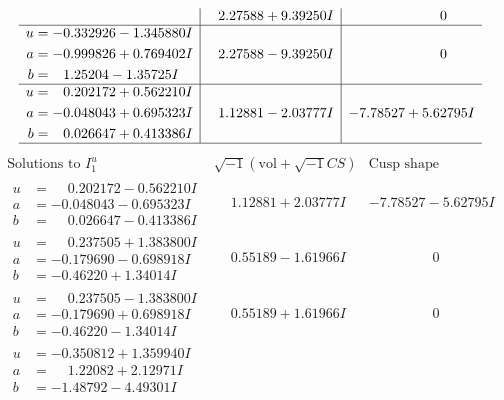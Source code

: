 \documentclass[1p]{elsarticle_modified}
\theoremstyle{definition}
\newcommand{\I}{\sqrt{-1}}
\begin{document}
$$\begin{array}{c|c|c}
 & \phantom{-}2.27588 + 9.39250 I & \phantom{-0.000000 } 0 \\ \hline\begin{aligned}
u &= -0.332926 - 1.345880 I \\
a &= -0.999826 + 0.769402 I \\
b &= \phantom{-}1.25204 - 1.35725 I\end{aligned}
 & \phantom{-}2.27588 - 9.39250 I & \phantom{-0.000000 } 0 \\ \hline\begin{aligned}
u &= \phantom{-}0.202172 + 0.562210 I \\
a &= -0.048043 + 0.695323 I \\
b &= \phantom{-}0.026647 + 0.413386 I\end{aligned}
 & \phantom{-}1.12881 - 2.03777 I & -7.78527 + 5.62795 I\\
 \hline 
 \end{array}$$\newpage$$\begin{array}{c|c|c}  
\text{Solutions to }I^u_{1}& \I (\text{vol} + \sqrt{-1}CS) & \text{Cusp shape}\\
 \hline 
\begin{aligned}
u &= \phantom{-}0.202172 - 0.562210 I \\
a &= -0.048043 - 0.695323 I \\
b &= \phantom{-}0.026647 - 0.413386 I\end{aligned}
 & \phantom{-}1.12881 + 2.03777 I & -7.78527 - 5.62795 I \\ \hline\begin{aligned}
u &= \phantom{-}0.237505 + 1.383800 I \\
a &= -0.179690 - 0.698918 I \\
b &= -0.46220 + 1.34014 I\end{aligned}
 & \phantom{-}0.55189 - 1.61966 I & \phantom{-0.000000 } 0 \\ \hline\begin{aligned}
u &= \phantom{-}0.237505 - 1.383800 I \\
a &= -0.179690 + 0.698918 I \\
b &= -0.46220 - 1.34014 I\end{aligned}
 & \phantom{-}0.55189 + 1.61966 I & \phantom{-0.000000 } 0 \\ \hline\begin{aligned}
u &= -0.350812 + 1.359940 I \\
a &= \phantom{-}1.22082 + 2.12971 I \\
b &= -1.48792 - 4.49301 I\end{aligned}

\end{array}$$
\end{document}
